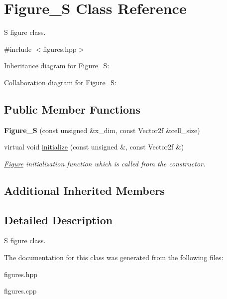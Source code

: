\hypertarget{classFigure__S}{}\section{Figure\+\_\+S Class Reference}
\label{classFigure__S}


S figure class.  




{\ttfamily \#include $<$figures.\+hpp$>$}



Inheritance diagram for Figure\+\_\+S\+:


Collaboration diagram for Figure\+\_\+S\+:
\subsection*{Public Member Functions}
\begin{DoxyCompactItemize}
\item 
\mbox{\label{classFigure__S_a4149d381dbfe0112951d2931bb595917}} 
{\bfseries Figure\+\_\+S} (const unsigned \&x\+\_\+dim, const Vector2f \&cell\+\_\+size)
\item 
\mbox{\label{classFigure__S_abc95548f07040bcec960b7ea243865b3}} 
virtual void \hyperlink{classFigure__S_abc95548f07040bcec960b7ea243865b3}{initialize} (const unsigned \&, const Vector2f \&)
\begin{DoxyCompactList}\small\item\em \hyperlink{classFigure}{Figure} initialization function which is called from the constructor. \end{DoxyCompactList}\end{DoxyCompactItemize}
\subsection*{Additional Inherited Members}


\subsection{Detailed Description}
S figure class. 

The documentation for this class was generated from the following files\+:\begin{DoxyCompactItemize}
\item 
figures.\+hpp\item 
figures.\+cpp\end{DoxyCompactItemize}
